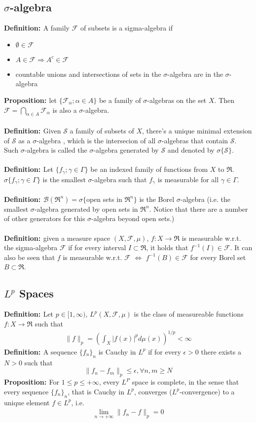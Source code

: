 \documentclass[a4paper,10pt]{report}
\theoremstyle{plain}
\theoremstyle{definition}
\newcommand\be{\begin{eqnarray}}    %
\newcommand\ee{\end{eqnarray}}
\newcommand{\DEF} {{\bf{Definition: }}}
\newcommand{\PROP} {{\bf{Proposition: }}}
\newcommand{\SA} {{$\sigma$-algebra} }
\newcommand{\SAs} {{$\sigma$-algebras} }
\begin{document}
\subsection{\SA}

\DEF A family $\mathcal{F}$ of subsets is a sigma-algebra if
\begin{itemize}
\item $\emptyset \in \mathcal{F}$
\item $A \in \mathcal{F} \Rightarrow A^c\in  \mathcal{F}$
\item countable unions and intersections of sets in the $\sigma$-algebra are in the $\sigma$-algebra
\end{itemize}
{\smallskip}
\PROP let $\{\mathcal{F}_\alpha;\alpha\in A\}$ be a family of $\sigma$-algebras on the set $X$. Then $\mathcal{F}=\bigcap_{\alpha\in A}\mathcal{F}_\alpha$ is also a $\sigma$-algebra.\\ \\
\DEF Given $\mathcal{S}$ a family of subsets of $X$, there's a unique minimal extension of $\mathcal{S}$ as a \SA, which is the intersecion of all \SAs  that contain $\mathcal{S}$. Such \SA is called the \SA generated by $\mathcal{S}$ and denoted by $\sigma\{\mathcal{S}\}$.\\ \\
\DEF Let $\{f_\gamma;\gamma\in \Gamma\}$ be an indexed family of functions from $X$ to $\Re$. $\sigma\{f_\gamma; \gamma\in \Gamma\}$ is the smallest \SA such that $f_\gamma$ is measurable for all $\gamma\in \Gamma$. \\ \\
\DEF $\mathcal{B}(\Re^n)=\sigma\{$open sets in $\Re^n \}$ is the Borel \SA (i.e. the smallest \SA generated by open sets in $\Re^n$. Notice that there are a number of other generators for this \SA beyond open sets.)\\ \\
\DEF given a measure space $(X,\mathcal{F},\mu)$, $f:X\rightarrow \Re$ is measurable w.r.t. the sigma-algebra $\mathcal{F}$ if for every interval $I\subset \Re$, it holds that $f^{-1}(I)\in \mathcal{F}$. It can also be seen that $f$ is measurable w.r.t. $\mathcal{F}$ $\Leftrightarrow$ $f^{-1}(B)\in \mathcal{F}$ for every Borel set $B\subset \Re$.


\subsection{$L^p$ Spaces}

\DEF Let $p\in [1,\infty)$, $L^p(X,\mathcal{F},\mu)$ is the class of measureable functions $f:X\rightarrow \Re$ such that
\be
\|f \|_p=\left( \int_X |f(x)|^p d\mu(x)\right)^{1/p}<\infty
\ee
\DEF A sequence $\{f_n\}_n$ is Cauchy in $L^p$ if for every $\epsilon >0$ there exists a $N>0$ such that 
\[
\|f_n-f_m\|_p \leq \epsilon, \forall n,m\geq N
\]
\PROP For $1\leq p \leq +\infty$, every $L^P$ space is complete, in the sense that every sequence $\{f_n\}_n$, that is Cauchy in $L^p$, converges ($L^p$-convergence)  to a unique element $f\in L^p$, i.e. 
\be
\lim_{n\rightarrow +\infty} \|f_n-f\|_p =0
\label{cauchyconv}
\ee
\end{document}
